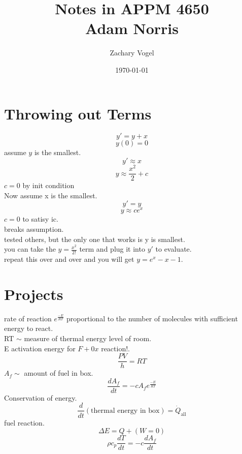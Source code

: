 \documentclass{article}
\begin{document}
\author{Zachary Vogel}
\date{\today}
\title{Notes in APPM 4650\\Adam Norris}

\maketitle



\section{Throwing out Terms}
\[y'=y+x\]
\[y(0)=0\]
assume $y$ is the smallest.\\
\[y'\approx x\]
\[y\approx \frac{x^2}{2}+c\]
$c=0$ by init condition\\


Now assume x is the smallest.\\
\[y'=y\]
\[y\approx ce^x\]
$c=0$ to satisy ic.\\
breaks assumption.\\
tested others, but the only one that works is y is smallest.\\

you can take the $y=\frac{x^2}{2!}$ term and plug it into $y'$ to evaluate.\\
repeat this over and over and you will get $y=e^x-x-1$.\\

\section{Projects}
rate of reaction $e^{\frac{-E}{RT}}$ proportional to the number of molecules with sufficient energy to react.\\
RT $\sim$ measure of thermal energy level of room.\\
E activation energy for $F+0x$ reaction!.\\
\[\frac{PV}{h}=RT\]
$A_f\sim$ amount of fuel in box.\\
\[\frac{dA_f}{dt}=-cA_fe^{\frac{-E}{RT}}\]
Conservation of energy.\\
\[\frac{d}{dt}(\text{thermal energy in box})=\dot{Q}_{\text{all}}\]
fuel reaction.\\
\[\Delta E=Q+(W=0)\]
\[\rho c_p\frac{dT}{dt}=-c\frac{dA_f}{dt}\]
\end{document}
